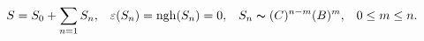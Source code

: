 \begin{equation}
S=S_{0}+\sum_{n=1}S_{n},\;\;\;\varepsilon(S_{n})=\mathrm{ngh}%
(S_{n})=0,\;\;\;S_{n}\thicksim(C)^{n-m}(B)^{m},\;\;\;0\leq m\leq n.
\label{series}
\end{equation}

